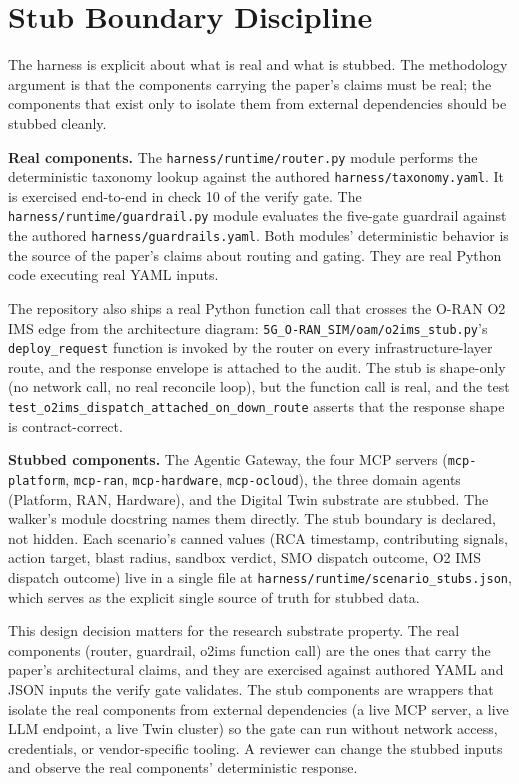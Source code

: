 \documentclass[twocolumn,10pt,a4paper]{article}
\begin{document}
\section{Stub Boundary Discipline}
\label{sec:stub}

The harness is explicit about what is real and what is stubbed. The methodology argument is that the components carrying the paper's claims must be real; the components that exist only to isolate them from external dependencies should be stubbed cleanly.

\textbf{Real components.} The \texttt{harness/runtime/router.py} module performs the deterministic taxonomy lookup against the authored \texttt{harness/taxonomy.yaml}. It is exercised end-to-end in check 10 of the verify gate. The \texttt{harness/runtime/guardrail.py} module evaluates the five-gate guardrail against the authored \texttt{harness/guardrails.yaml}. Both modules' deterministic behavior is the source of the paper's claims about routing and gating. They are real Python code executing real YAML inputs.

The repository also ships a real Python function call that crosses the O-RAN O2 IMS edge from the architecture diagram: \texttt{5G\_O-RAN\_SIM/oam/o2ims\_stub.py}'s \texttt{deploy\_request} function is invoked by the router on every infrastructure-layer route, and the response envelope is attached to the audit. The stub is shape-only (no network call, no real reconcile loop), but the function call is real, and the test \texttt{test\_o2ims\_dispatch\_attached\_on\_down\_route} asserts that the response shape is contract-correct.

\textbf{Stubbed components.} The Agentic Gateway, the four MCP servers (\texttt{mcp-platform}, \texttt{mcp-ran}, \texttt{mcp-hardware}, \texttt{mcp-ocloud}), the three domain agents (Platform, RAN, Hardware), and the Digital Twin substrate are stubbed. The walker's module docstring names them directly. The stub boundary is declared, not hidden. Each scenario's canned values (RCA timestamp, contributing signals, action target, blast radius, sandbox verdict, SMO dispatch outcome, O2 IMS dispatch outcome) live in a single file at \texttt{harness/runtime/scenario\_stubs.json}, which serves as the explicit single source of truth for stubbed data.

This design decision matters for the research substrate property. The real components (router, guardrail, o2ims function call) are the ones that carry the paper's architectural claims, and they are exercised against authored YAML and JSON inputs the verify gate validates. The stub components are wrappers that isolate the real components from external dependencies (a live MCP server, a live LLM endpoint, a live Twin cluster) so the gate can run without network access, credentials, or vendor-specific tooling. A reviewer can change the stubbed inputs and observe the real components' deterministic response.
\end{document}
